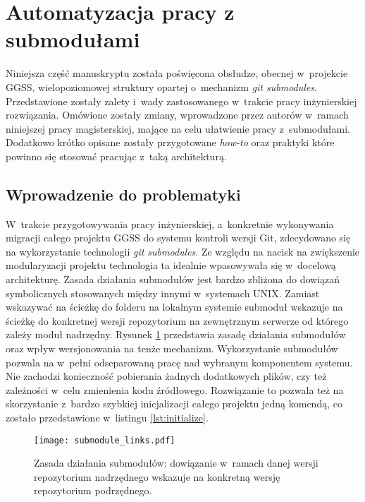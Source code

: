\clearpage
\section{Automatyzacja pracy z submodułami}
\label{sec:gitio}

Niniejsza część manuskryptu została poświęcona obsłudze, obecnej w~projekcie GGSS, wielopoziomowej struktury  opartej o~mechanizm \emph{git submodules}. Przedstawione zostały zalety i~wady zastosowanego w~trakcie pracy inżynierskiej rozwiązania. Omówione zostały zmiany, wprowadzone przez autorów w~ramach niniejszej pracy magisterskiej, mające na celu ułatwienie pracy z~submodułami. Dodatkowo krótko opisane zostały przygotowane \emph{how-to} oraz praktyki które powinno się stosować pracując z~taką architekturą.

\subsection{Wprowadzenie do problematyki}
W~trakcie przygotowywania pracy inżynierskiej, a~konkretnie wykonywania migracji całego projektu GGSS do systemu kontroli wersji Git, zdecydowano się na wykorzystanie technologii \emph{git submodules}. Ze względu na nacisk na zwiększenie modularyzacji projektu technologia ta idealnie wpasowywała się w~docelową architekturę. Zasada działania submodułów jest bardzo zbliżona do dowiązań symbolicznych stosowanych między innymi w~systemach UNIX. Zamiast wskazywać na ścieżkę do folderu na lokalnym systemie submoduł wskazuje na ścieżkę do konkretnej wersji repozytorium na zewnętrznym serwerze od którego zależy moduł nadrzędny. Rysunek \ref{fig:submodules_links} przedstawia zasadę działania submodułów oraz wpływ wersjonowania na tenże mechanizm. Wykorzystanie submodułów pozwala na w~pełni odseparowaną pracę nad wybranym komponentem systemu. Nie zachodzi konieczność pobierania żadnych dodatkowych plików, czy też zależności w~celu zmienienia kodu źródłowego. Rozwiązanie to pozwala też na skorzystanie z~bardzo szybkiej inicjalizacji całego projektu jedną komendą, co zostało przedstawione w~listingu \ref{lst:initialize}.

\begin{figure}[H]
    \centering
    \texttt{[image: submodule\_links.pdf]}
    \caption{Zasada działania submodułów: dowiązanie w~ramach danej wersji repozytorium nadrzędnego wskazuje na konkretną wersję repozytorium podrzędnego.}
    \label{fig:submodules_links}
\end{figure}

